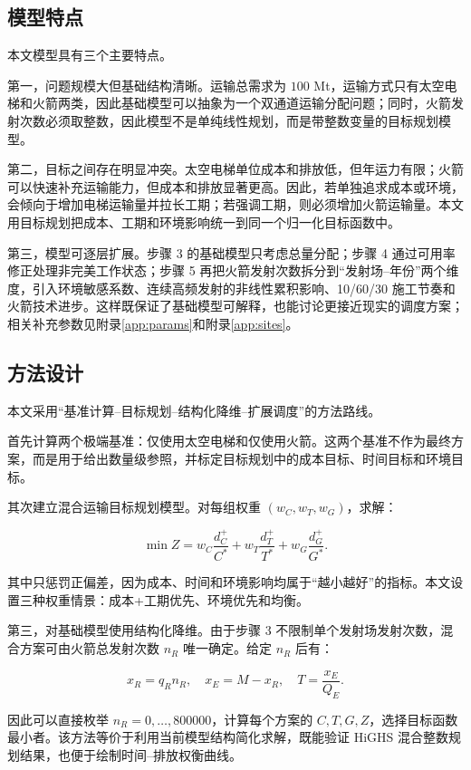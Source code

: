 \documentclass[12pt,a4paper,UTF8]{article}
\begin{document}
\subsection{模型特点}

本文模型具有三个主要特点。

第一，问题规模大但基础结构清晰。运输总需求为 \(100\) Mt，运输方式只有太空电梯和火箭两类，因此基础模型可以抽象为一个双通道运输分配问题；同时，火箭发射次数必须取整数，因此模型不是单纯线性规划，而是带整数变量的目标规划模型。

第二，目标之间存在明显冲突。太空电梯单位成本和排放低，但年运力有限；火箭可以快速补充运输能力，但成本和排放显著更高。因此，若单独追求成本或环境，会倾向于增加电梯运输量并拉长工期；若强调工期，则必须增加火箭运输量。本文用目标规划把成本、工期和环境影响统一到同一个归一化目标函数中。

第三，模型可逐层扩展。步骤 3 的基础模型只考虑总量分配；步骤 4 通过可用率修正处理非完美工作状态；步骤 5 再把火箭发射次数拆分到“发射场--年份”两个维度，引入环境敏感系数、连续高频发射的非线性累积影响、10/60/30 施工节奏和火箭技术进步。这样既保证了基础模型可解释，也能讨论更接近现实的调度方案；相关补充参数见附录\ref{app:params}和附录\ref{app:sites}。

\subsection{方法设计}

本文采用“基准计算--目标规划--结构化降维--扩展调度”的方法路线。

首先计算两个极端基准：仅使用太空电梯和仅使用火箭。这两个基准不作为最终方案，而是用于给出数量级参照，并标定目标规划中的成本目标、时间目标和环境目标。

其次建立混合运输目标规划模型。对每组权重 \((w_C,w_T,w_G)\)，求解：

\[
\min Z=
w_C\frac{d_C^+}{C^*}
+w_T\frac{d_T^+}{T^*}
+w_G\frac{d_G^+}{G^*}.
\]

其中只惩罚正偏差，因为成本、时间和环境影响均属于“越小越好”的指标。本文设置三种权重情景：成本+工期优先、环境优先和均衡。

第三，对基础模型使用结构化降维。由于步骤 3 不限制单个发射场发射次数，混合方案可由火箭总发射次数 \(n_R\) 唯一确定。给定 \(n_R\) 后有：

\[
x_R=q_Rn_R,\quad x_E=M-x_R,\quad T=\frac{x_E}{Q_E}.
\]

因此可以直接枚举 \(n_R=0,\ldots,800000\)，计算每个方案的 \(C,T,G,Z\)，选择目标函数最小者。该方法等价于利用当前模型结构简化求解，既能验证 HiGHS 混合整数规划结果，也便于绘制时间--排放权衡曲线。
\end{document}
